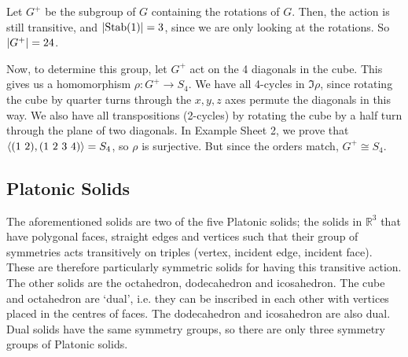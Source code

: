 \documentclass{article}
\begin{document}
	Let $G^+$ be the subgroup of $G$ containing the rotations of $G$. Then, the action is still transitive, and $\abs{\operatorname{Stab}(1)} = 3$, since we are only looking at the rotations. So $\abs{G^+} = 24$.

	Now, to determine this group, let $G^+$ act on the 4 diagonals in the cube. This gives us a homomorphism $\rho\colon G^+ \to S_4$. We have all 4-cycles in $\Im \rho$, since rotating the cube by quarter turns through the $x, y, z$ axes permute the diagonals in this way. We also have all transpositions (2-cycles) by rotating the cube by a half turn through the plane of two diagonals. In Example Sheet 2, we prove that $\langle (1\ 2), (1\ 2\ 3\ 4) \rangle = S_4$, so $\rho$ is surjective. But since the orders match, $G^+ \cong S_4$.

	\subsection{Platonic Solids}
	The aforementioned solids are two of the five Platonic solids; the solids in $\mathbb R^3$ that have polygonal faces, straight edges and vertices such that their group of symmetries acts transitively on triples (vertex, incident edge, incident face). These are therefore particularly symmetric solids for having this transitive action. The other solids are the octahedron, dodecahedron and icosahedron. The cube and octahedron are `dual', i.e. they can be inscribed in each other with vertices placed in the centres of faces. The dodecahedron and icosahedron are also dual. Dual solids have the same symmetry groups, so there are only three symmetry groups of Platonic solids.
\end{document}
